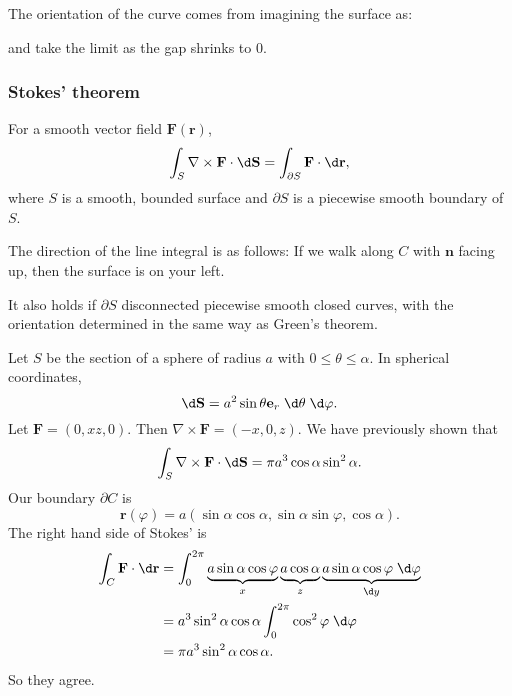 \documentclass[a4paper]{article}
\begin{document}
The orientation of the curve comes from imagining the surface as:
\begin{center}
\end{center}
and take the limit as the gap shrinks to 0.

\subsubsection{Stokes' theorem}
\begin{thm}
  For a smooth vector field $\mathbf{F}(\mathbf{r})$,
  \[
    \int_S \nabla\times \mathbf{F}\cdot \d \mathbf{S} = \int_{\partial S} \mathbf{F}\cdot \d \mathbf{r},
  \]
  where $S$ is a smooth, bounded surface and $\partial S$ is a piecewise smooth boundary of $S$.

  The direction of the line integral is as follows: If we walk along $C$ with $\mathbf{n}$ facing up, then the surface is on your left.
\end{thm}
It also holds if $\partial S$ disconnected piecewise smooth closed curves, with the orientation determined in the same way as Green's theorem.

\begin{eg}
  Let $S$ be the section of a sphere of radius $a$ with $0 \leq \theta \leq \alpha$. In spherical coordinates,
  \[
    \d \mathbf{S} = a^2 \sin \theta \mathbf{e}_r \;\d \theta\;\d \varphi.
  \]
  Let $\mathbf{F} = (0, xz, 0)$. Then $\nabla \times \mathbf{F} = (-x, 0, z)$. We have previously shown that
  \[
    \int_S \nabla\times \mathbf{F}\cdot \d \mathbf{S} = \pi a^3 \cos\alpha\sin^2 \alpha.
  \]
  Our boundary $\partial C$ is
  \[
    \mathbf{r}(\varphi) = a(\sin \alpha\cos \alpha, \sin \alpha\sin \varphi, \cos \alpha).
  \]
  The right hand side of Stokes' is
  \begin{align*}
    \int_C \mathbf{F}\cdot \d \mathbf{r}  &= \int_0^{2\pi}\underbrace{a\sin \alpha\cos \varphi}_{x}\underbrace{\vphantom{\varphi}a\cos\alpha}_z \underbrace{a\sin \alpha\cos\varphi\;\d \varphi}_{\d y}\\
    &= a^3\sin^2\alpha\cos\alpha\int_0^{2\pi}\cos^2\varphi\;\d \varphi\\
    &= \pi a^3\sin^2\alpha\cos\alpha.
  \end{align*}
  So they agree.
\end{eg}
\end{document}
